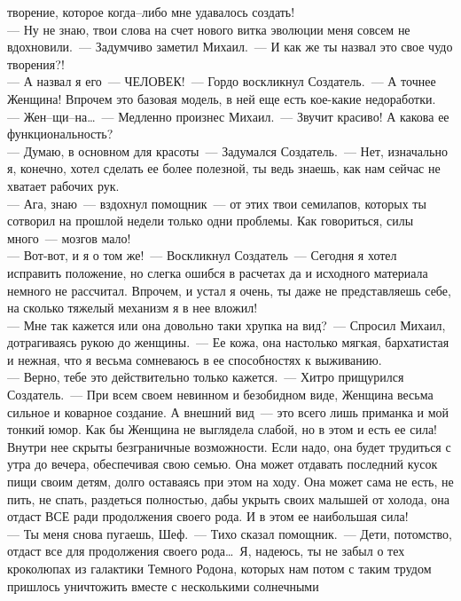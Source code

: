 творение, которое когда--либо мне удавалось создать!\\
--- Ну не знаю, твои слова на счет нового витка эволюции меня совсем не 
вдохновили.~--- Задумчиво заметил Михаил.~--- И как же ты назвал это свое 
чудо творения?!\\
--- А назвал я его~--- ЧЕЛОВЕК!~--- Гордо воскликнул Создатель.~--- А точнее 
Женщина! Впрочем это базовая модель, в ней еще есть кое-какие недоработки.\\
--- Жен--щи--на\ldots~--- Медленно произнес Михаил.~--- Звучит красиво! А 
какова ее функциональность?\\
--- Думаю, в основном для красоты~--- Задумался 
Создатель.~--- Нет, изначально я, конечно, хотел сделать ее более 
полезной, ты ведь знаешь, как нам сейчас не хватает рабочих рук.\\
--- Ага, знаю~--- вздохнул помощник~--- от этих твои семилапов, которых ты 
сотворил на прошлой недели только одни проблемы. Как говориться, силы 
много~--- мозгов мало!\\
--- Вот-вот, и я о том же!~--- Воскликнул Создатель~--- Сегодня я
хотел исправить положение, но слегка ошибся в расчетах да и исходного 
материала немного не рассчитал. Впрочем, и устал я очень, ты даже не 
представляешь себе, на сколько тяжелый механизм я в нее вложил!\\
--- Мне так кажется или она довольно таки хрупка на вид?~--- Спросил Михаил, 
дотрагиваясь рукою до женщины.~--- Ее кожа, она настолько мягкая, 
бархатистая и нежная, что я весьма сомневаюсь в ее способностях к 
выживанию.\\
--- Верно, тебе это действительно только кажется.~--- Хитро 
прищурился Создатель.~--- При всем своем невинном и безобидном виде, 
Женщина весьма сильное и коварное создание. А внешний вид~--- это всего 
лишь приманка и мой тонкий юмор. Как бы Женщина не выглядела слабой, но в
этом и есть ее сила! Внутри нее скрыты безграничные возможности. Если 
надо, она будет трудиться с утра до вечера, обеспечивая свою семью. Она 
может отдавать последний кусок пищи своим детям, долго оставаясь при 
этом на ходу. Она может сама не есть, не пить, не спать, раздеться 
полностью, дабы укрыть своих малышей от холода, она отдаст ВСЕ ради 
продолжения своего рода. И в этом ее наибольшая сила!\\
--- Ты меня снова пугаешь, Шеф.~--- Тихо сказал помощник.~--- Дети, 
потомство, отдаст все для продолжения своего рода\ldots\ Я, надеюсь, ты не 
забыл о тех кроколюпах из галактики Темного Родона, которых нам потом с 
таким трудом пришлось уничтожить вместе с несколькими солнечными 
